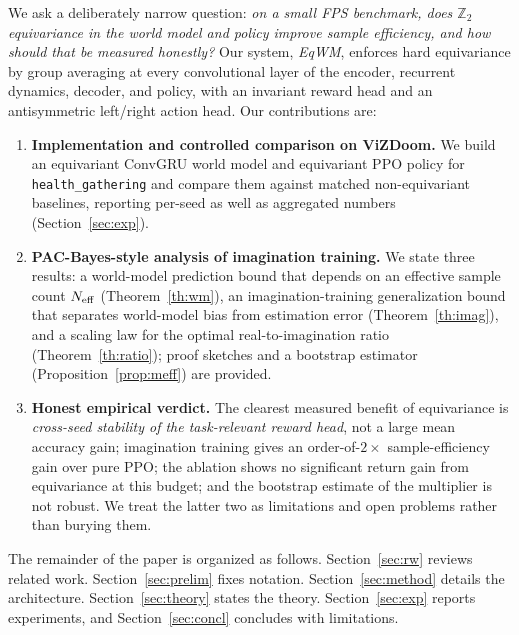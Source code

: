 \documentclass[preprint,12pt]{elsarticle}
\begin{document}
We ask a deliberately narrow question: \emph{on a small FPS benchmark, does
$\mathbb Z_2$ equivariance in the world model and policy improve sample
efficiency, and how should that be measured honestly?} Our system,
\emph{EqWM}, enforces hard equivariance by group averaging
\cite{gcnn2016} at every convolutional layer of the encoder, recurrent
dynamics, decoder, and policy, with an invariant reward head and an
antisymmetric left/right action head. Our contributions are:
\begin{enumerate}[leftmargin=*]
  \item \textbf{Implementation and controlled comparison on ViZDoom.} We
        build an equivariant ConvGRU world model and equivariant PPO policy
        for \texttt{health\_gathering} and compare them against matched
        non-equivariant baselines, reporting per-seed as well as aggregated
        numbers (Section~\ref{sec:exp}).
  \item \textbf{PAC-Bayes-style analysis of imagination training.} We state
        three results: a world-model prediction bound that depends on an
        effective sample count $N_{\rm eff}$ (Theorem~\ref{th:wm}), an
        imagination-training generalization bound that separates world-model
        bias from estimation error (Theorem~\ref{th:imag}), and a scaling law
        for the optimal real-to-imagination ratio (Theorem~\ref{th:ratio});
        proof sketches and a bootstrap estimator (Proposition~\ref{prop:meff})
        are provided.
  \item \textbf{Honest empirical verdict.} The clearest measured benefit of
        equivariance is \emph{cross-seed stability of the task-relevant
        reward head}, not a large mean accuracy gain; imagination training
        gives an order-of-$2\times$ sample-efficiency gain over pure
        PPO; the ablation shows no significant return gain from equivariance
        at this budget; and the bootstrap estimate of the multiplier is not
        robust. We treat the latter two as limitations and open problems
        rather than burying them.
\end{enumerate}

The remainder of the paper is organized as follows. Section~\ref{sec:rw}
reviews related work. Section~\ref{sec:prelim} fixes notation.
Section~\ref{sec:method} details the architecture. Section~\ref{sec:theory}
states the theory. Section~\ref{sec:exp} reports experiments, and
Section~\ref{sec:concl} concludes with limitations.

\end{document}
